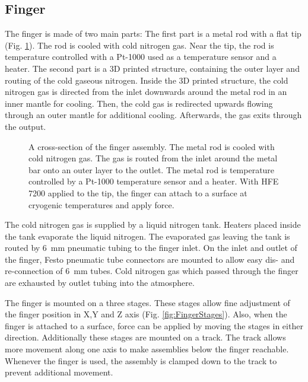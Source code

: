 \subsection{Finger}

The finger is made of two main parts: The first part is a metal rod with a flat tip (Fig. \ref{fig:querschnittfinger}). The rod is cooled with cold nitrogen gas. Near the tip, the rod is temperature controlled with a Pt-1000 used as a temperature sensor and a heater. The second part is a 3D printed structure, containing the outer layer and routing of the cold gaseous nitrogen. Inside the 3D printed structure, the cold nitrogen gas is directed from the inlet downwards around the metal rod in an inner mantle for cooling. Then, the cold gas is redirected upwards flowing through an outer mantle for additional cooling. Afterwards, the gas exits through the output.

\begin{figure}[hbt!]
	\centering
	
	\caption{A cross-section of the finger assembly. The metal rod is cooled with cold nitrogen gas. The gas is routed from the inlet around the metal bar onto an outer layer to the outlet. The metal rod is temperature controlled by a Pt-1000 temperature sensor and a heater. With HFE 7200 applied to the tip, the finger can attach to a surface at cryogenic temperatures and apply force. }
	\label{fig:querschnittfinger}
\end{figure}

The cold nitrogen gas is supplied by a liquid nitrogen tank. Heaters placed inside the tank evaporate the liquid nitrogen. The evaporated gas leaving the tank is routed by \SI{6}{\milli\meter} pneumatic tubing to the finger inlet. On the inlet and outlet of the finger, Festo pneumatic tube connectors are mounted to allow easy dis- and re-connection of \SI{6}{\milli\meter} tubes. Cold nitrogen gas which passed through the finger are exhausted by outlet tubing into the atmosphere.

The finger is mounted on a three stages. These stages allow fine adjustment of the finger position in X,Y and Z axis (Fig. \ref{fig:FingerStages}). Also, when the finger is attached to a surface, force can be applied by moving the stages in either direction. Additionally these stages are mounted on a track. The track allows more movement along one axis to make assemblies below the finger reachable. Whenever the finger is used, the assembly is clamped down to the track to prevent additional movement.

